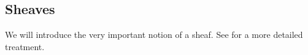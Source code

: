 \subsection{Sheaves}
We will introduce the very important notion of a sheaf.
See \cite{sheavGeomLogic} for a more detailed treatment.



